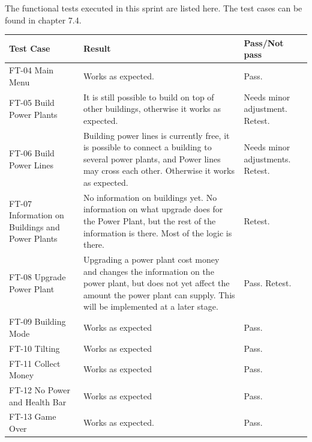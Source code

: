 	The functional tests executed in this sprint are listed here. The test cases can be found in chapter 7.4.


	\begin{tabular}{| p{2cm} | p{7cm} | p{3cm} |}
		\hline
		\rowcolor{lightgray}
		{\bf Test Case} & {\bf Result} & {\bf Pass/Not pass} \\ \hline
	  	
	  	FT-04 Main Menu & Works as expected. & Pass. \\ \hline

		FT-05 Build Power Plants & It is still possible to build on top of other buildings, otherwise it works as expected. & Needs minor adjustment. Retest. \\ \hline

		FT-06 Build Power Lines & Building power lines is currently free, it is possible to connect a building to several power plants, and Power lines may cross each other. Otherwise it works as expected. & Needs minor adjustments. Retest. \\ \hline

		FT-07 Information on Buildings and Power Plants & No information on buildings yet. No information on what upgrade does for the Power Plant, but the rest of the information is there. Most of the logic is there. & Retest.\\ \hline

		FT-08 Upgrade Power Plant & Upgrading a power plant cost money and changes the information on the power plant, but does not yet affect the amount the power plant can supply. This will be implemented at a later stage. & Pass. Retest. \\ \hline

		FT-09 Building Mode & Works as expected & Pass. \\ \hline

		FT-10 Tilting & Works as expected & Pass. \\ \hline

		FT-11 Collect Money & Works as expected & Pass. \\ \hline

		FT-12 No Power and Health Bar & Works as expected & Pass. \\ \hline

		FT-13 Game Over & Works as expected. & Pass. \\ \hline

	\end{tabular}

